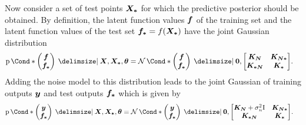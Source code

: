 Now consider a set of test points $\bm{X_\ast}$ for which the predictive posterior should be obtained.
By definition, the latent function values $\bm{f}$ of the training set and the latent function values of the test set $\bm{f_\ast} = f(\bm{X_\ast})$ have the joint Gaussian distribution
\begin{align}
    \Prob*{\begin{pmatrix}
        \mat{f} \\
        \mat{f_\ast}
    \end{pmatrix} \given \mat{X}, \mat{X_\ast}, \mat{\theta}} &= \Gaussian*{\begin{pmatrix}
        \mat{f} \\
        \mat{f_\ast}
    \end{pmatrix} \given \mat{0}, \begin{bmatrix}
        \mat{K_N} & \mat{K_{N\ast}} \\
        \mat{K_{\ast N}} & \mat{K_{\ast}}
    \end{bmatrix}}.
\end{align}
Adding the noise model to this distribution leads to the joint Gaussian of training outputs $\bm{y}$ and test outputs $\bm{f_\ast}$ which is given by
\begin{align}
    \Prob*{\begin{pmatrix}
        \mat{y} \\
        \mat{f_\ast}
    \end{pmatrix} \given \mat{X}, \mat{X_\ast}, \mat{\theta}} &= \Gaussian*{\begin{pmatrix}
        \mat{y} \\
        \mat{f_\ast}
    \end{pmatrix} \given \mat{0}, \begin{bmatrix}
        \mat{K_N} + \sigma_n^2 \Eye & \mat{K_{N\ast}} \\
        \mat{K_{\ast N}} & \mat{K_{\ast}}
    \end{bmatrix}}.
\end{align}

